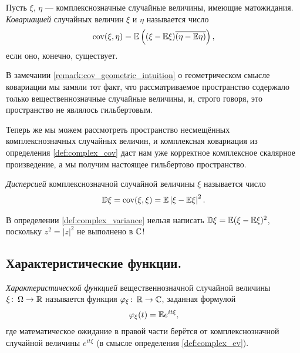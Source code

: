 \documentclass[../main.tex]{subfiles}
\begin{document}
\begin{df}
 \label{def:complex_cov}
 Пусть $ \xi $, $ \eta $ --- комплекснозначные случайные величины, имеющие матожидания. \textit{Ковариацией} случайных величин $ \xi $ и $ \eta $ называется число
 \begin{align*}
  \mathrm{cov}(\xi,\eta) = \mathbb E\left((\xi-\mathbb E\xi) \overline{(\eta - \mathbb E\eta)}\right),
 \end{align*} если оно, конечно, существует.
\end{df}

\begin{remrk*}
 В замечании \ref{remark:cov_geometric_intuition} о геометрическом смысле ковариации мы замяли тот факт, что рассматриваемое пространство содержало только вещественнозначные случайные величины, и, строго говоря, это пространство не являлось гильбертовым.

 Теперь же мы можем рассмотреть пространство несмещённых комплекснозначных случайных величин, и комплексная ковариация из определения \ref{def:complex_cov} даст нам уже корректное комплексное скалярное произведение, а мы получим настоящее гильбертово пространство.
\end{remrk*}

\begin{df}[дисперсия]
 \label{def:complex_variance}
 \textit{Дисперсией} комплекснозначной случайной величины $ \xi $  называется число
 \begin{align*}
  \mathbb D\xi = \mathrm{cov}(\xi,\xi) = \mathbb E \left| \xi-\mathbb E\xi \right|^{2}.
 \end{align*}
\end{df}

\begin{remrk*}
 В определении \ref{def:complex_variance} нельзя написать $ \mathbb D\xi = \mathbb E (\xi-\mathbb E\xi)^{2} $, поскольку $ z^{2} = \left| z \right|^{2} $ не выполнено в $ \mathbb{C} $!
\end{remrk*}

\subsection{Характеристические функции.}

\begin{df}
 \textit{Характеристической функцией} вещественнозначной случайной величины $ \xi \colon\, \Omega \to \mathbb{R} $ называется функция $ \varphi_\xi \colon\, \mathbb{R} \to \mathbb{C} $, заданная формулой
 \begin{align*}
  \varphi_\xi(t) = \mathbb E  e^{it\xi} ,
 \end{align*} где математическое ожидание в правой части берётся от комплекснозначной случайной величины $ e^{it\xi} $ (в смысле определения \ref{def:complex_ev}).
\end{df}
\end{document}
